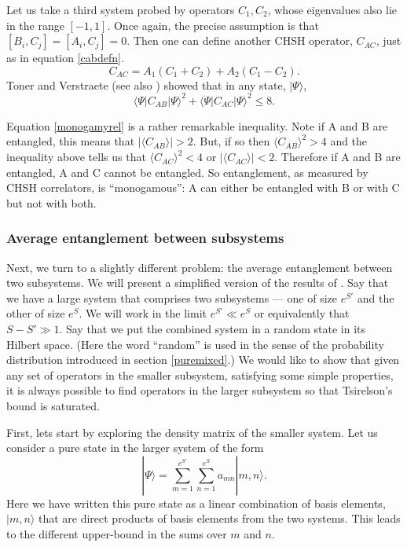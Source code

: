 \documentclass[12pt]{article}
\newcommand{\be}{\begin{equation}}
\newcommand{\ee}{\end{equation}}
\begin{document}
Let us take a third system probed by operators $C_1, C_2$, whose eigenvalues also lie in the range $[-1,1]$. Once again, the precise assumption is that  $[B_i, C_j] = [A_i, C_j] = 0$. Then one can define another CHSH operator, $C_{AC}$, just as in equation \eqref{cabdefn}.
\be
\label{cacdefn}
C_{AC} =  A_1 (C_1 + C_2)  +  A_2 (C_1 - C_2).
\ee
Toner and Verstraete \cite{toner2006monogamy} (see also \cite{toner2009monogamy}) showed that in any state, $|\Psi \rangle$,
\be
\label{monogamyrel}
\langle \Psi| C_{A B} |\Psi \rangle^2 + \langle \Psi| C_{A C} |\Psi \rangle^2 \leq 8.
\ee

Equation \eqref{monogamyrel} is a rather remarkable inequality. Note if A and B are entangled, this means that $|\langle C_{AB} \rangle| > 2.$ But, if so then $\langle C_{AB} \rangle ^2 > 4$ and the inequality above tells us that $\langle C_{AC} \rangle^2 < 4$ or $|\langle C_{AC} \rangle| < 2$. Therefore if A and B are entangled, A and C cannot be entangled. So entanglement, as measured by CHSH correlators, is ``monogamous'': A can either be entangled with B or with C but not with both.

\subsubsection{Average entanglement between subsystems \label{secavent}}
Next, we turn to a slightly different problem: the average entanglement between two subsystems. We will present a simplified version of the results of \cite{Page:1993df,lubkin1978entropy}. Say that we have a large system that comprises two subsystems --- one of size $e^{S'}$ and the other of size $e^{S}$. We will work in the limit $e^{S'} \ll e^{S}$ or equivalently that $S - S' \gg 1$.  Say that
we put the combined system in a random state in its Hilbert space. (Here the word ``random'' is used in the sense of the probability distribution introduced in section \eqref{puremixed}.)  We would like to show that given any set
of operators in the smaller subsystem, satisfying some simple properties, it is always possible to find operators in the larger subsystem so that Tsirelson's bound is saturated.


First, lets start by exploring the density matrix of the smaller system. Let us consider a pure state in the larger system of the form
\be
|\Psi \rangle = \sum_{m=1}^{e^{S'}} \sum_{n=1}^{e^{S}} a_{m n} |m, n \rangle.
\ee
Here we have written this pure state as a linear combination of basis elements, $|m, n \rangle$ that are direct products of basis elements from the two systems. This leads to the different upper-bound in the sums over $m$ and $n$.
\end{document}
